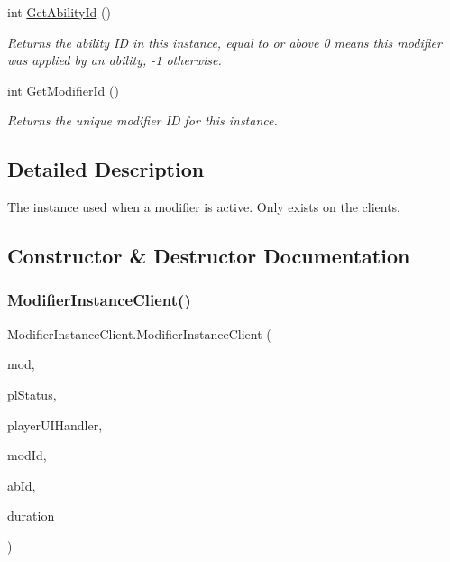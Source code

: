 \begin{DoxyCompactItemize}
int \hyperlink{class_modifier_instance_client_abbe31055b1201afce4372df1a1d1e10a}{Get\+Ability\+Id} ()
\begin{DoxyCompactList}\small\item\em Returns the ability ID in this instance, equal to or above 0 means this modifier was applied by an ability, -\/1 otherwise. \end{DoxyCompactList}\item 
int \hyperlink{class_modifier_instance_client_ae6f8817f0de275a92204d1595d26e731}{Get\+Modifier\+Id} ()
\begin{DoxyCompactList}\small\item\em Returns the unique modifier ID for this instance. \end{DoxyCompactList}\end{DoxyCompactItemize}


\subsection{Detailed Description}
The instance used when a modifier is active. Only exists on the clients. 



\subsection{Constructor \& Destructor Documentation}
\hypertarget{class_modifier_instance_client_afbdbe5c786c135f6ac463412c34d4dbe}{}\label{class_modifier_instance_client_afbdbe5c786c135f6ac463412c34d4dbe} 
\subsubsection{\texorpdfstring{Modifier\+Instance\+Client()}{ModifierInstanceClient()}}
{\footnotesize\ttfamily Modifier\+Instance\+Client.\+Modifier\+Instance\+Client (\begin{DoxyParamCaption}\item[{\hyperlink{class_modifier}{Modifier}}]{mod,  }\item[{\hyperlink{class_player_status}{Player\+Status}}]{pl\+Status,  }\item[{\hyperlink{class_player_u_i_handler}{Player\+U\+I\+Handler}}]{player\+U\+I\+Handler,  }\item[{int}]{mod\+Id,  }\item[{int}]{ab\+Id,  }\item[{float}]{duration }\end{DoxyParamCaption})}



